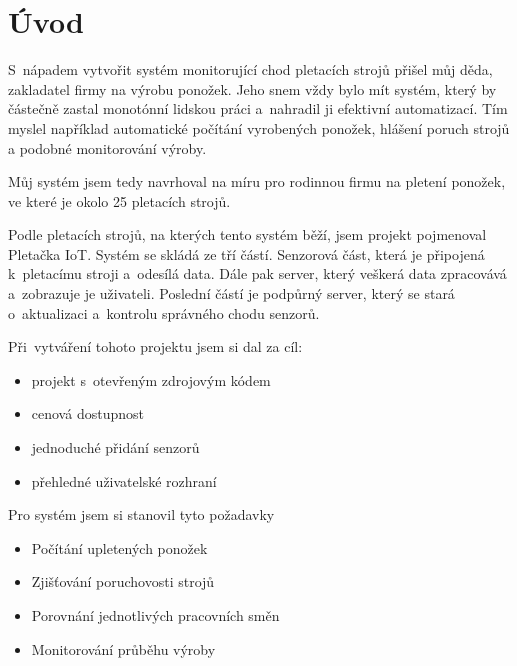 \chapter*{Úvod}

S~nápadem vytvořit systém monitorující chod pletacích strojů přišel můj děda, zakladatel firmy na výrobu ponožek.
Jeho snem vždy bylo mít systém, který by částečně zastal monotónní lidskou práci a~nahradil ji efektivní automatizací.
Tím myslel například automatické počítání vyrobených ponožek, hlášení poruch strojů a podobné monitorování výroby.

Můj systém jsem tedy navrhoval na míru pro rodinnou firmu na pletení ponožek, ve které je okolo 25 pletacích strojů. 

Podle pletacích strojů, na kterých tento systém běží, jsem projekt pojmenoval Pletačka IoT. 
Systém se skládá ze tří částí. Senzorová část, která je připojená k~pletacímu stroji a~odesílá data.
Dále pak server, který veškerá data zpracovává a~zobrazuje je uživateli.
Poslední částí je podpůrný server, který se stará o~aktualizaci a~kontrolu správného chodu senzorů.\newline


Při~vytváření tohoto projektu jsem si dal za cíl:
\begin{itemize}
    \item projekt s~otevřeným zdrojovým kódem
    \item cenová dostupnost
    \item jednoduché přidání senzorů
    \item přehledné uživatelské rozhraní
\end{itemize}

\newpage
Pro systém jsem si stanovil tyto požadavky
\begin{itemize}
    \item Počítání upletených ponožek
    \item Zjišťování poruchovosti strojů
    \item Porovnání jednotlivých pracovních směn
    \item Monitorování průběhu výroby
\end{itemize}

